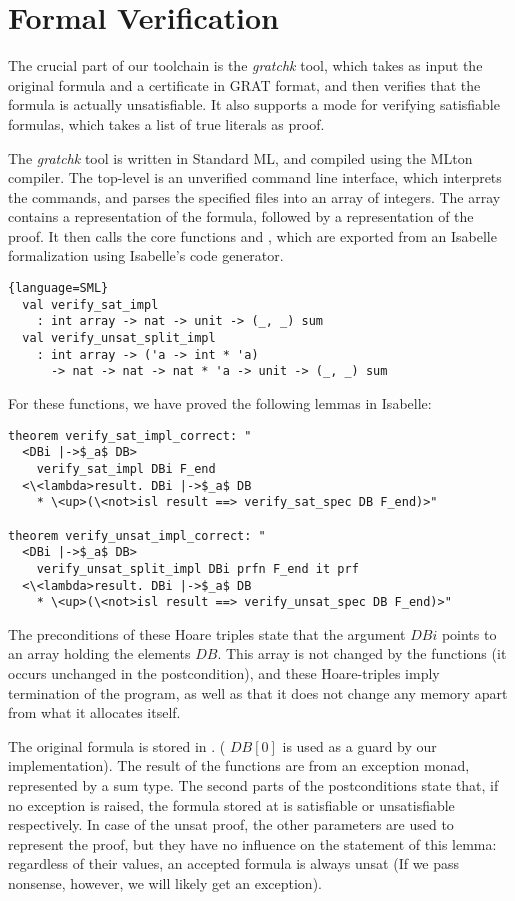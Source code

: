 \documentclass[conference]{IEEEtran}
\makeatletter
\newcommand{\isai}{\lstinline[language=isabelle,basicstyle=\normalsize\ttfamily\slshape]}
\renewcommand\lstinline[1][]{%
  \leavevmode
  \ifmmode\expandafter\hbox\fi\bgroup
    \def\lst@boxpos{b}%
    \lsthk@PreSet\lstset{flexiblecolumns,#1}%
    \lsthk@TextStyle
    \@ifnextchar\bgroup{\afterassignment\lst@InlineG \let\@let@token}%
                       \lstinline@}
\makeatother
\begin{document}
\section{Formal Verification}
The crucial part of our toolchain is the {\sl gratchk} tool, which takes as input the original formula and a
certificate in GRAT format, and then verifies that the formula is actually unsatisfiable.
It also supports a mode for verifying satisfiable formulas, which takes a list of true literals as proof.

The {\sl gratchk} tool is written in Standard ML, and compiled using the MLton compiler.
The top-level is an unverified command line interface, which interprets the commands, and parses the specified files
into an array of integers. The array contains a representation of the formula, followed by a representation of the proof.
It then calls the core functions \isai{verify_sat_impl} and \isai{verify_unsat_split_impl}, which are
exported from an Isabelle formalization using Isabelle's code generator.

\begin{lstlisting}{language=SML}
  val verify_sat_impl
    : int array -> nat -> unit -> (_, _) sum
  val verify_unsat_split_impl
    : int array -> ('a -> int * 'a)
      -> nat -> nat -> nat * 'a -> unit -> (_, _) sum
\end{lstlisting}

For these functions, we have proved the following lemmas in Isabelle:

\begin{lstlisting}
theorem verify_sat_impl_correct: "
  <DBi |->$_a$ DB>
    verify_sat_impl DBi F_end
  <\<lambda>result. DBi |->$_a$ DB
    * \<up>(\<not>isl result ==> verify_sat_spec DB F_end)>"

theorem verify_unsat_impl_correct: "
  <DBi |->$_a$ DB>
    verify_unsat_split_impl DBi prfn F_end it prf
  <\<lambda>result. DBi |->$_a$ DB
    * \<up>(\<not>isl result ==> verify_unsat_spec DB F_end)>"
\end{lstlisting}
The preconditions of these Hoare triples state that the argument \isai$DBi$ points to an array
holding the elements \isai$DB$. This array is not changed by the functions (it occurs unchanged in the postcondition),
and these Hoare-triples imply termination of the program, as well as that it does not change any memory apart from what it
allocates itself.

The original formula is stored in \isai{DB[1..<F_end]}. (\isai$DB[0]$ is used as a guard by our implementation).
The result of the functions are from an exception monad, represented by a sum type.
The second parts of the postconditions state that, if no exception is raised, the formula stored at \isai{DB[1..<F_end]} is satisfiable or unsatisfiable respectively. In case of the unsat proof,
the other parameters \isai{prfn, it, prf} are used to represent the proof, but they have no influence on the statement
of this lemma: regardless of their values, an accepted formula is always unsat (If we pass nonsense, however, we will likely
get an exception).
\end{document}
